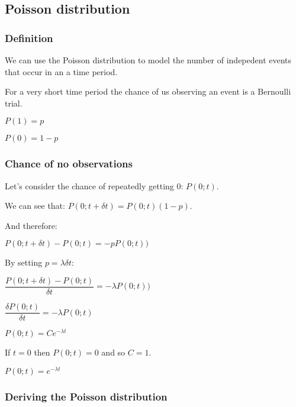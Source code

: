 
\subsection{Poisson distribution}

\subsubsection{Definition}

We can use the Poisson distribution to model the number of indepedent events that occur in an a time period.

For a very short time period the chance of us observing an event is a Bernoulli trial.

\(P(1)=p\)

\(P(0)=1-p\)

\subsubsection{Chance of no observations}

Let's consider the chance of repeatedly getting \(0\): \(P(0;t)\).

We can see that: \(P(0;t+\delta t)=P(0;t)(1-p)\).

And therefore:

\(P(0;t+\delta t)-P(0;t)=-pP(0;t))\)

By setting \(p=\lambda \delta t\):

\(\dfrac{P(0;t+\delta t)-P(0;t)}{\delta t}=-\lambda P(0;t))\)

\(\dfrac{\delta P(0;t)}{\delta t}=-\lambda P(0;t)\)

\(P(0;t)=Ce^{-\lambda t}\)

If \(t=0\) then \(P(0;t)=0\) and so \(C=1\).

\(P(0;t)=e^{-\lambda t}\)

\subsubsection{Deriving the Poisson distribution}


